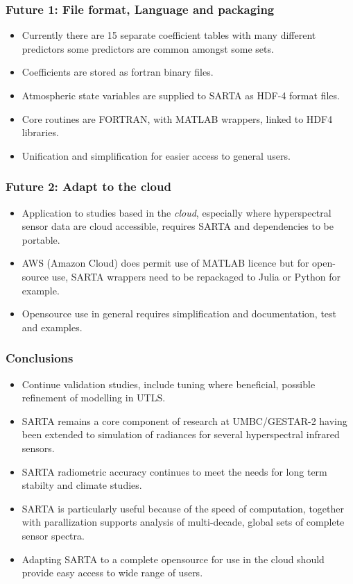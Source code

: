 \documentclass[10pt,t]{beamer}
\begin{document}
\begin{frame}
  \frametitle{Future 1: File format, Language and packaging}
  \begin{itemize}
    \item Currently there are 15 separate coefficient tables with many different predictors
      some predictors are common amongst some sets.
    \item Coefficients are stored as fortran binary files.
    \item Atmospheric state variables are supplied to SARTA as HDF-4 format files.
    \item Core routines are FORTRAN, with MATLAB wrappers, linked to HDF4 libraries.
    \item Unification and simplification for easier access to general users.

  \end{itemize}
\end{frame}

\begin{frame}
  \frametitle{Future 2: Adapt to the cloud}
  \begin{itemize}
  \item Application to studies based in the {\it cloud}, especially where hyperspectral sensor
    data are cloud accessible, requires SARTA and dependencies to be portable.
  \item AWS (Amazon Cloud) does permit use of MATLAB licence but for open-source use,
    SARTA wrappers need to be repackaged to Julia or Python for example.
  \item Opensource use in general requires simplification and documentation, test and examples.

  \end{itemize}
\end{frame}

\begin{frame}
  \frametitle{Conclusions}
  \begin{itemize}
  \item Continue validation studies, include tuning where beneficial, possible
    refinement of modelling in UTLS.
  \item SARTA remains a core component of research at UMBC/GESTAR-2 having been extended
    to simulation of radiances for several hyperspectral infrared sensors.
  \item SARTA radiometric accuracy continues to meet the needs for long term stabilty
    and climate studies.
  \item SARTA is particularly useful because of the speed of computation, together
    with parallization supports analysis of multi-decade, global sets of complete
    sensor spectra.
  \item Adapting SARTA to a complete opensource for use in the cloud should provide
    easy access to wide range of users. 

  \end{itemize}
\end{frame}

\end{document}
